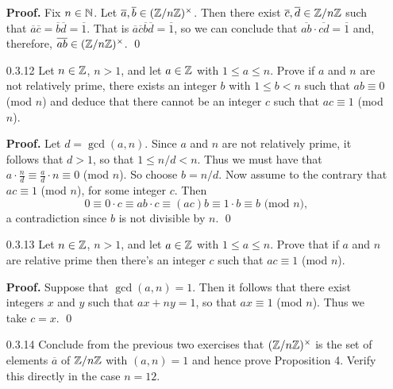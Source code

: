 \begin{enumerate}
      \textbf{Proof.} Fix $n \in \mathbb{N}$. Let
      $\overline{a}, \overline{b} \in (\mathbb{Z}/n\mathbb{Z})^\times$. Then there exist
      $\overline{c}, \overline{d} \in \mathbb{Z}/n\mathbb{Z}$ such that
      $\overline{a}\overline{c} = \overline{b}\overline{d} = \overline{1}$. That
      is $\overline{a}\overline{c}\overline{b}\overline{d} = \overline{1}$, so
      we can conclude that $\overline{ab}\cdot\overline{cd} = \overline{1}$ and,
      therefore, $\overline{ab} \in (\mathbb{Z}/n\mathbb{Z})^\times$. \qed
   \item[0.3.12]  Let $n \in \mathbb{Z}$, $n > 1$, and let $a \in \mathbb{Z}$ with
                  $1 \le a \le n$. Prove if $a$ and $n$ are not relatively
                  prime, there exists an integer $b$ with $1 \le b < n$ such
                  that $ab \equiv 0$ (mod $n$) and deduce that there cannot be
                  an integer $c$ such that $ac \equiv 1$ (mod $n$).

      \textbf{Proof.} Let $d = \gcd(a, n)$. Since $a$ and $n$ are not relatively
      prime, it follows that $d > 1$, so that $1 \le n/d < n$. Thus we must have 
      that $a \cdot \frac{n}{d} \equiv \frac{a}{d} \cdot n \equiv 0$ (mod $n$).
      So choose $b = n/d$. Now assume to the contrary that $ac \equiv 1$
      (mod $n$), for some integer $c$. Then
      $$0 \equiv 0 \cdot c \equiv ab \cdot c \equiv (ac)b \equiv 1 \cdot b
        \equiv b \text{ (mod } n),$$
      a contradiction since $b$ is not divisible by $n$. \qed
   \item[0.3.13]  Let $n \in \mathbb{Z}$, $n > 1$, and let $a \in \mathbb{Z}$ with
                  $1 \le a \le n$. Prove that if $a$ and $n$ are relative prime
                  then there's an integer $c$ such that $ac \equiv 1$ (mod $n$).

      \textbf{Proof.} Suppose that $\gcd(a, n) = 1$. Then it follows that there
      exist integers $x$ and $y$ such that $ax + ny = 1$, so that
      $ax \equiv 1$ (mod $n$). Thus we take $c = x$. \qed
   \item[0.3.14]  Conclude from the previous two exercises that
                  $(\mathbb{Z}/n\mathbb{Z})^\times$ is the set of elements $\overline{a}$ of
                  $\mathbb{Z}/n\mathbb{Z}$ with $(a, n) = 1$ and hence prove Proposition 4.
                  Verify this directly in the case $n = 12$.


\end{enumerate}
